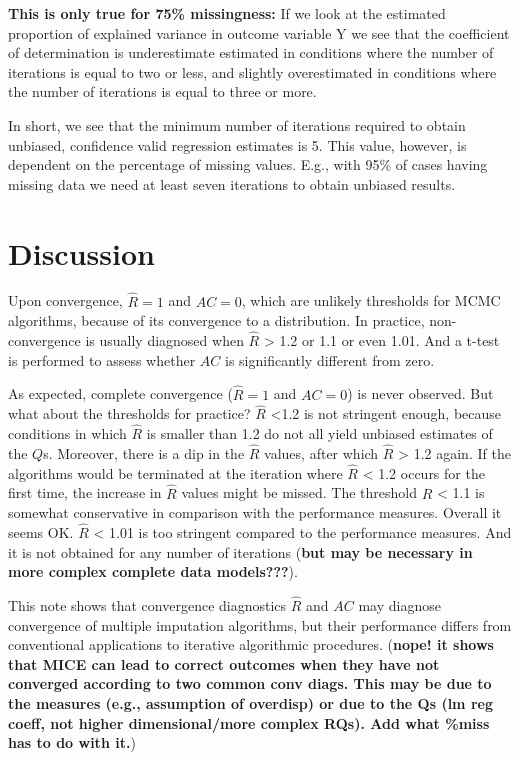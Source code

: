 \documentclass[Royal,times,sageh]{sagej}
\begin{document}
\textbf{This is only true for 75\% missingness:} If we look at the
estimated proportion of explained variance in outcome variable Y we see
that the coefficient of determination is underestimate estimated in
conditions where the number of iterations is equal to two or less, and
slightly overestimated in conditions where the number of iterations is
equal to three or more.

In short, we see that the minimum number of iterations required to
obtain unbiased, confidence valid regression estimates is 5. This value,
however, is dependent on the percentage of missing values. E.g., with
95\% of cases having missing data we need at least seven iterations to
obtain unbiased results.

\hypertarget{discussion}{%
\section{Discussion}\label{discussion}}

Upon convergence, \(\widehat{R}=1\) and \(AC=0\), which are unlikely
thresholds for MCMC algorithms, because of its convergence to a
distribution. In practice, non-convergence is usually diagnosed when
\(\widehat{R}\) \textgreater{} 1.2 or 1.1 or even 1.01. And a t-test is
performed to assess whether \(AC\) is significantly different from zero.

As expected, complete convergence (\(\widehat{R}=1\) and \(AC=0\)) is
never observed. But what about the thresholds for practice?
\(\widehat{R}\) \textless1.2 is not stringent enough, because conditions
in which \(\widehat{R}\) is smaller than 1.2 do not all yield unbiased
estimates of the \(Q\)s. Moreover, there is a dip in the \(\widehat{R}\)
values, after which \(\widehat{R}\) \textgreater{} 1.2 again. If the
algorithms would be terminated at the iteration where \(\widehat{R}\)
\textless{} 1.2 occurs for the first time, the increase in
\(\widehat{R}\) values might be missed. The threshold \(\widehat{R}\)
\textless{} 1.1 is somewhat conservative in comparison with the
performance measures. Overall it seems OK. \(\widehat{R}\) \textless{}
1.01 is too stringent compared to the performance measures. And it is
not obtained for any number of iterations (\textbf{but may be necessary
in more complex complete data models???}).

This note shows that convergence diagnostics \(\widehat{R}\) and \(AC\)
may diagnose convergence of multiple imputation algorithms, but their
performance differs from conventional applications to iterative
algorithmic procedures. (\textbf{nope! it shows that MICE can lead to
correct outcomes when they have not converged according to two common
conv diags. This may be due to the measures (e.g., assumption of
overdisp) or due to the Qs (lm reg coeff, not higher dimensional/more
complex RQs). Add what \%miss has to do with it.})
\end{document}
